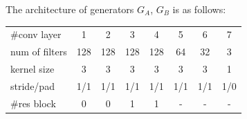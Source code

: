 

The architecture of generators $G_A$, $G_B$ is as follows:
\begin{center}
\begin{scriptsize}
\begin{tabular}{l | c c c c c c c}
\hline
  \#conv layer      &1      &2    &3     &4    &5    &6    & 7 \\
  num of filters    &128    &128  &128   &128  &64   &32   & 3 \\
  kernel size       &3      &3    &3     & 3   &3    &3    & 1 \\
  stride/pad        &1/1    &1/1  &1/1   &1/1  &1/1  &1/1  & 1/0  \\
  \#res block       &0      &0    &1     &1    &-    &-    & -  \\
\hline
\end{tabular}
\end{scriptsize}
\end{center}
\vspace{0.5em}


